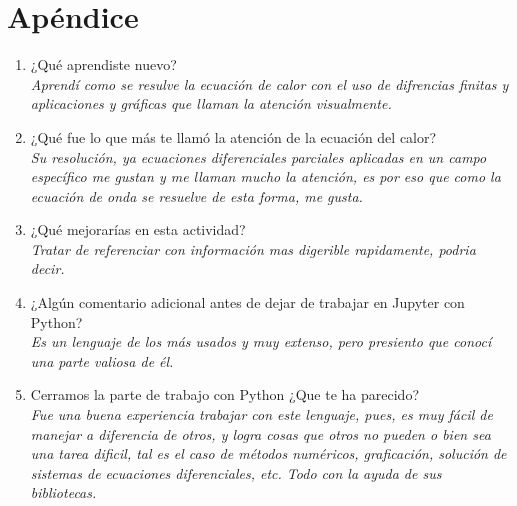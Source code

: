 \documentclass[12pt]{article}
\begin{document}
\section*{Apéndice}
\begin{enumerate}

\item ¿Qué aprendiste nuevo?\\
\textit{Aprendí como se resulve la ecuación de calor con el uso de difrencias finitas y aplicaciones y gráficas que llaman la atención visualmente.}

\item ¿Qué fue lo que más te llamó la atención de la ecuación del calor?\\
\textit{Su resolución, ya ecuaciones diferenciales parciales aplicadas en un campo específico me gustan y me llaman mucho la atención, es por eso que como la ecuación de onda se resuelve de esta forma, me gusta.}

\item ¿Qué mejorarías en esta actividad?\\
\textit{Tratar de referenciar con información mas digerible rapidamente, podria decir.}

\item ¿Algún comentario adicional antes de dejar de trabajar en Jupyter con Python?\\
\textit{Es un lenguaje de los más usados y muy extenso, pero presiento que conocí una parte valiosa de él.}

\item Cerramos la parte de trabajo con Python ¿Que te ha parecido?\\
\textit{Fue una buena experiencia trabajar con este lenguaje, pues, es muy fácil de manejar a diferencia de otros, y logra cosas que otros no pueden o bien sea una tarea dificil, tal es el caso de métodos numéricos, graficación, solución de sistemas de ecuaciones diferenciales, etc. Todo con la ayuda de sus bibliotecas.}

\end{enumerate}
\end{document}
